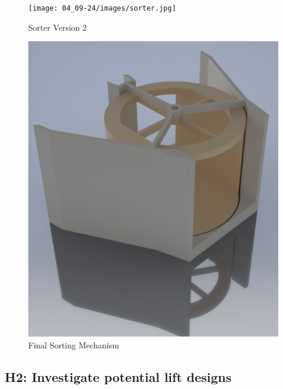 \documentclass{article}
\begin{document}
\begin{figure}
    \centering
    \texttt{[image: 04\_09-24/images/sorter.jpg]}
    \caption{Sorter Version 2}
    \label{fig:Sorter Version 2}
\end{figure}

\begin{figure}
    \centering
    \includegraphics[width=.6\textwidth]{04_09-24/images/sorter2.png}
    \caption{Final Sorting Mechanism}
    \label{fig:Final Sorting Mechnism}
\end{figure}

\subsection{H2: Investigate potential lift designs}
\end{document}
